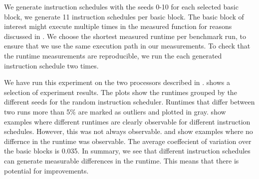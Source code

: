 We generate instruction schedules with the seeds 0-10 for each selected basic block, \ie we generate 11 instruction schedules per basic block.
The basic block of interest might execute multiple times in the measured function for reasons discussed in .
We choose the shortest measured runtime per benchmark run, to ensure that we use the same execution path in our measurements.
To check that the runtime measurements are reproducible, we run the each generated instruction schedule two times.

We have run this experiment on the two processors described in .
 shows a selection of experiment results.
The plots show the runtimes grouped by the different seeds for the random instruction scheduler.
Runtimes that differ between two runs more than 5\% are marked as outliers and plotted in gray.
 show examples where different runtimes are clearly observable for different instruction schedules.
However, this was not always observable.
 and  show examples where no differnce in the runtime was observable.
The average coeffecient of variation over the basic blocks is 0.035.
In summary, we see that different instruction schedules can generate measurable differences in the runtime.
This means that there is potential for improvements.
